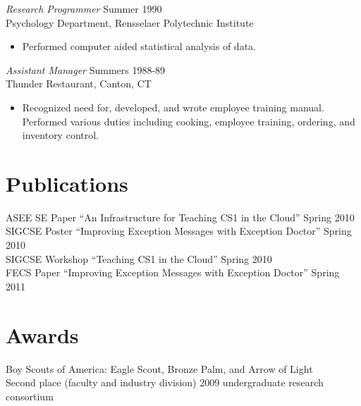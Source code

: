 \documentclass[line,margin]{res}
\begin{document}
\begin{resume}
                {\sl Research Programmer} \hfill            Summer 1990 \\
                Psychology Department, Rensselaer Polytechnic 
                Institute 
                 \begin{itemize}  \itemsep -2pt %
                 \item Performed computer aided statistical analysis 
                    of data. 
                 \end{itemize} 
                {\sl Assistant Manager} \hfill        Summers 1988-89 \\
                Thunder Restaurant, Canton, CT
                  \begin{itemize}
                   \item Recognized need for, developed, and wrote 
                    employee training manual. Performed various 
                    duties including cooking, employee training, 
                    ordering, and inventory control. 
                   \end{itemize} 
 
\section{Publications}
ASEE SE Paper ``An Infrastructure for Teaching CS1 in the Cloud'' Spring 2010 \\
SIGCSE Poster ``Improving Exception Messages with Exception Doctor'' Spring 2010 \\
SIGCSE Workshop ``Teaching CS1 in the Cloud'' Spring 2010 \\
FECS Paper ``Improving Exception Messages with Exception Doctor'' Spring 2011

\section{Awards}
Boy Scouts of America: Eagle Scout, Bronze Palm, and Arrow of Light \\
Second place (faculty and industry division) 2009 undergraduate research consortium

\end{resume}
\end{document}
